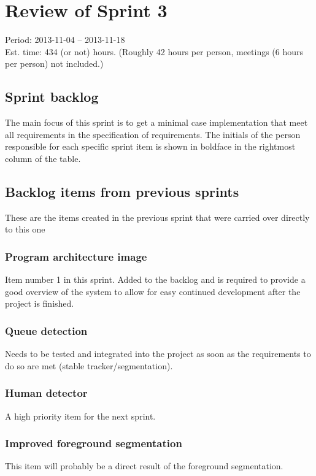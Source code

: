 \section{Review of Sprint 3}
\label{sec:sprint3}
\large Period: 2013-11-04 -- 2013-11-18 \\ 
\large Est. time: 434 (or not) hours. (Roughly 42 hours per person, meetings (6 hours per person) not included.)

\subsection{Sprint backlog}
The main focus of this sprint is to get a minimal case implementation that meet all requirements in the specification of requirements. The initials of the person responsible for each specific sprint item is shown in boldface in the rightmost column of the table.

\subsection{Backlog items from previous sprints}
These are the items created in the previous sprint that were carried over directly to this one

\subsubsection{Program architecture image}
Item number 1 in this sprint. Added to the backlog and is required to provide a good overview of the system to allow for easy continued development after the project is finished.

\subsubsection{Queue detection}
Needs to be tested and integrated into the project as soon as the requirements to do so are met (stable tracker/segmentation).

\subsubsection{Human detector}
A high priority item for the next sprint.

\subsubsection{Improved foreground segmentation}
This item will probably be a direct result of the foreground segmentation.


